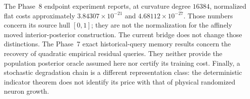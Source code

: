 The Phase~8 endpoint experiment reports, at curvature degree $16384$,
normalized flat costs approximately $3.84307\times10^{-21}$ and
$4.68112\times10^{-27}$. Those numbers concern its source hull $[0,1]$;
they are not the normalization for the affinely moved interior-posterior
construction. The current bridge does not change those distinctions.
The Phase~7 exact historical-query memory results concern the recovery of
quadratic empirical residual queries. They neither provide the
population posterior oracle assumed here nor certify its training cost.
Finally, a stochastic degradation chain is a different representation
class: the deterministic indicator theorem does not identify its price
with that of physical randomized neuron growth.
